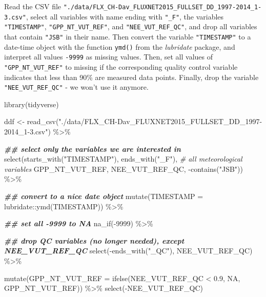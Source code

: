 \documentclass[
]{book}
\newenvironment{Shaded}{\begin{snugshade}}{\end{snugshade}}
\newcommand{\AttributeTok}[1]{\textcolor[rgb]{0.77,0.63,0.00}{#1}}
\newcommand{\CommentTok}[1]{\textcolor[rgb]{0.56,0.35,0.01}{\textit{#1}}}
\newcommand{\ConstantTok}[1]{\textcolor[rgb]{0.00,0.00,0.00}{#1}}
\newcommand{\DecValTok}[1]{\textcolor[rgb]{0.00,0.00,0.81}{#1}}
\newcommand{\DocumentationTok}[1]{\textcolor[rgb]{0.56,0.35,0.01}{\textbf{\textit{#1}}}}
\newcommand{\FloatTok}[1]{\textcolor[rgb]{0.00,0.00,0.81}{#1}}
\newcommand{\FunctionTok}[1]{\textcolor[rgb]{0.00,0.00,0.00}{#1}}
\newcommand{\NormalTok}[1]{#1}
\newcommand{\OtherTok}[1]{\textcolor[rgb]{0.56,0.35,0.01}{#1}}
\newcommand{\SpecialCharTok}[1]{\textcolor[rgb]{0.00,0.00,0.00}{#1}}
\newcommand{\StringTok}[1]{\textcolor[rgb]{0.31,0.60,0.02}{#1}}
\begin{document}
Read the CSV file \texttt{"./data/FLX\_CH-Dav\_FLUXNET2015\_FULLSET\_DD\_1997-2014\_1-3.csv"}, select all variables with name ending with \texttt{"\_F"}, the variables \texttt{"TIMESTAMP"}, \texttt{"GPP\_NT\_VUT\_REF"}, and \texttt{"NEE\_VUT\_REF\_QC"}, and drop all variables that contain \texttt{"JSB"} in their name. Then convert the variable \texttt{"TIMESTAMP"} to a date-time object with the function \texttt{ymd()} from the \emph{lubridate} package, and interpret all values \texttt{-9999} as missing values. Then, set all values of \texttt{"GPP\_NT\_VUT\_REF"} to missing if the corresponding quality control variable indicates that less than 90\% are measured data points. Finally, drop the variable \texttt{"NEE\_VUT\_REF\_QC"} - we won't use it anymore.

\begin{Shaded}
\begin{Highlighting}[]
\FunctionTok{library}\NormalTok{(tidyverse)}

\NormalTok{ddf }\OtherTok{\textless{}{-}} \FunctionTok{read\_csv}\NormalTok{(}\StringTok{"./data/FLX\_CH{-}Dav\_FLUXNET2015\_FULLSET\_DD\_1997{-}2014\_1{-}3.csv"}\NormalTok{) }\SpecialCharTok{\%\textgreater{}\%} 
  
  \DocumentationTok{\#\# select only the variables we are interested in}
  \FunctionTok{select}\NormalTok{(}\FunctionTok{starts\_with}\NormalTok{(}\StringTok{"TIMESTAMP"}\NormalTok{),}
         \FunctionTok{ends\_with}\NormalTok{(}\StringTok{"\_F"}\NormalTok{),   }\CommentTok{\# all meteorological variables}
\NormalTok{         GPP\_NT\_VUT\_REF,}
\NormalTok{         NEE\_VUT\_REF\_QC,}
         \SpecialCharTok{{-}}\FunctionTok{contains}\NormalTok{(}\StringTok{"JSB"}\NormalTok{)) }\SpecialCharTok{\%\textgreater{}\%}

  \DocumentationTok{\#\# convert to a nice date object}
  \FunctionTok{mutate}\NormalTok{(}\AttributeTok{TIMESTAMP =}\NormalTok{ lubridate}\SpecialCharTok{::}\FunctionTok{ymd}\NormalTok{(TIMESTAMP)) }\SpecialCharTok{\%\textgreater{}\%}

  \DocumentationTok{\#\# set all {-}9999 to NA}
  \FunctionTok{na\_if}\NormalTok{(}\SpecialCharTok{{-}}\DecValTok{9999}\NormalTok{) }\SpecialCharTok{\%\textgreater{}\%}

  \DocumentationTok{\#\# drop QC variables (no longer needed), except NEE\_VUT\_REF\_QC}
  \FunctionTok{select}\NormalTok{(}\SpecialCharTok{{-}}\FunctionTok{ends\_with}\NormalTok{(}\StringTok{"\_QC"}\NormalTok{), NEE\_VUT\_REF\_QC) }\SpecialCharTok{\%\textgreater{}\%} 

  \FunctionTok{mutate}\NormalTok{(}\AttributeTok{GPP\_NT\_VUT\_REF =} \FunctionTok{ifelse}\NormalTok{(NEE\_VUT\_REF\_QC }\SpecialCharTok{\textless{}} \FloatTok{0.9}\NormalTok{, }\ConstantTok{NA}\NormalTok{, GPP\_NT\_VUT\_REF)) }\SpecialCharTok{\%\textgreater{}\%} 
  \FunctionTok{select}\NormalTok{(}\SpecialCharTok{{-}}\NormalTok{NEE\_VUT\_REF\_QC)}
\end{Highlighting}
\end{Shaded}
\end{document}
